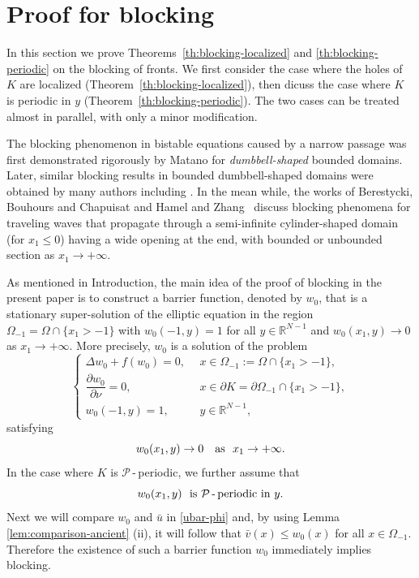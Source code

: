 \documentclass[a4paper,12pt,fullpage]{article}
\numberwithin{equation}{section}
\def\R{{\mathbb R}}
\begin{document}

\section{Proof for blocking}\label{s:blocking}

In this section we prove Theorems~\ref{th:blocking-localized} and \ref{th:blocking-periodic} on the blocking of fronts. We first consider the case where the holes of $K$ are localized (Theorem~\ref{th:blocking-localized}), then dicuss the case where $K$ is periodic in $y$ (Theorem~\ref{th:blocking-periodic}). The two cases can be treated almost in parallel, with only a minor modification.

The blocking phenomenon in bistable equations caused by a narrow passage was first demonstrated rigorously by Matano \cite{M} for {\em dumbbell-shaped} bounded domains. Later, similar blocking results in bounded dumbbell-shaped domains were obtained by many authors including \cite{MM, J}. In the mean while, the works of  Berestycki, Bouhours and Chapuisat \cite{BBC} and Hamel and Zhang~\cite{HZ} discuss blocking phenomena for traveling waves that propagate through a semi-infinite cylinder-shaped domain (for $x_1\le0$) having a wide opening at the end, with bounded or unbounded section as $x_1\to+\infty$.

As mentioned in Introduction, the main idea of the proof of blocking in the present paper is to construct a barrier function, denoted by $w_0$, that is a stationary super-solution of the elliptic equation in the region $\Omega_{-1}=\Omega\cap\{x_1>-1\}$ with $w_{0}(-1, y) = 1$ for all $y\in \R^{N-1}$ and $w_{0}(x_{1}, y) \to 0$ as $x_{1}\to+\infty$. More precisely, $w_0$ is a solution of the problem
\begin{equation}\label{B}
\left\{
\begin{array}{ll}
\Delta w_0 +f(w_0)=0, \ \ &x\in \Omega_{-1} := \Omega\cap \{ x_1 > -1 \},   \\[4pt]
\dfrac{\partial w_0}{\partial \nu} = 0, \ \ &x\in \partial K =  \partial\Omega_{-1}\cap\{x_1 > - 1\},  \\[8pt]
w_0(-1, y) = 1,  & y\in \R^{N-1},%
\end{array}\right.
\end{equation}
satisfying
\begin{equation}\label{w-infty}
w_0(x_1,y)\to 0\quad \hbox{as}\ \ x_1\to+\infty.
\end{equation}
In the case where $K$ is ${\mathcal P}$\,-\,periodic, we further assume that
\begin{equation}\label{w-periodic}
w_0(x_1, y) \ \ \hbox{is ${\mathcal P}$\,-\,periodic in $y$}.
\end{equation}
Next we will compare $w_0$ and $\bar{u}$ in \eqref{ubar-phi} and, by using Lemma \ref{lem:comparison-ancient} (ii),  it will follow that $\bar{v}(x)\le w_0(x)$ for all $x\in\Omega_{-1}$. Therefore the existence of such a barrier function $w_0$ immediately implies blocking. 
\end{document}
